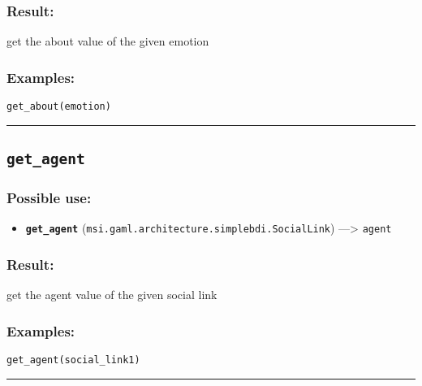 \documentclass[]{book}
\providecommand{\tightlist}{%
  \setlength{\itemsep}{0pt}\setlength{\parskip}{0pt}}
\theoremstyle{definition}
\theoremstyle{definition}
\theoremstyle{definition}
\theoremstyle{remark}
\begin{document}
\subsubsection{Result:}\label{result-188}

get the about value of the given emotion

\subsubsection{Examples:}\label{examples-141}

\begin{verbatim}
get_about(emotion) 
\end{verbatim}

\begin{center}\rule{0.5\linewidth}{\linethickness}\end{center}

\subsection{\texorpdfstring{\texttt{get\_agent}}{get\_agent}}\label{get_agent}

\subsubsection{Possible use:}\label{possible-use-195}

\begin{itemize}
\tightlist
\item
  \textbf{\texttt{get\_agent}}
  (\texttt{msi.gaml.architecture.simplebdi.SocialLink})
  ---\textgreater{} \texttt{agent}
\end{itemize}

\subsubsection{Result:}\label{result-189}

get the agent value of the given social link

\subsubsection{Examples:}\label{examples-142}

\begin{verbatim}
get_agent(social_link1) 
\end{verbatim}

\begin{center}\rule{0.5\linewidth}{\linethickness}\end{center}
\end{document}

